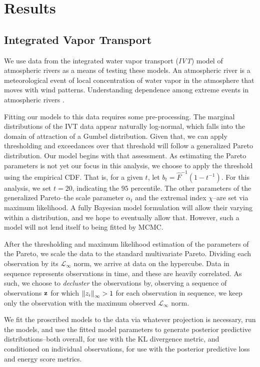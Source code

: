 
\section{Results}

\subsection{Integrated Vapor Transport}
We use data from the integrated water vapor transport (\emph{IVT}) model
  of atmospheric rivers as a means of testing these models.  An atmospheric river is a meteorological
  event of local concentration of water vapor in the atmosphere that moves with wind patterns.
  Understanding dependence among extreme events in atmospheric rivers .

Fitting our models to this data requires some pre-processing.  The marginal distributions of the
  IVT data appear naturally log-normal, which falls into the domain of attraction of a Gumbel
  distribution.  Given that, we can apply thresholding and exceedances over that threshold will
  follow a generalized Pareto distribution.  Our model begins with that assessment.  As estimating
  the Pareto parameters is not yet our focus in this analysis, we choose to apply the threshold
  using the empirical CDF.  That is, for a given $t$, let $b_t = \hat{F}^{-1}(1 - t^{-1})$.  For
  this analysis, we set $t = 20$, indicating the $95$ percentile.  The other parameters of the
  generalized Pareto--the scale parameter $\alpha_t$ and the extremal index $\chi$--are set via
  maximum likelihood.  A fully Bayesian model formulation will allow their varying within a
  distribution, and we hope to eventually allow that.  However, such a model will not lend itself
  to being fitted by MCMC.

After the thresholding and maximum likelihood estimation of the parameters of the Pareto, we scale
  the data to the standard multivariate Pareto.  Dividing each observation by its
  $\mathcal{L}_{\infty}$ norm, we arrive at data on the hypercube.  Data in sequence represents
  observations in time, and these are heavily correlated.  As such, we choose to \emph{decluster}
  the observations by, observing a sequence of observations ${\bf z}$ for which $\left\lVert z_i \right\rVert_{\infty} > 1$
  for each observation in sequence, we keep only the observation with the maximum observed
  $\mathcal{L}_{\infty}$ norm.

We fit the proscribed models to the data via whatever projection is necessary, run the models, and
  use the fitted model parameters to generate posterior predictive distributions--both overall, for
  use with the KL divergence metric, and conditioned on individual observations, for use with the
  posterior predictive loss and energy score metrics.

